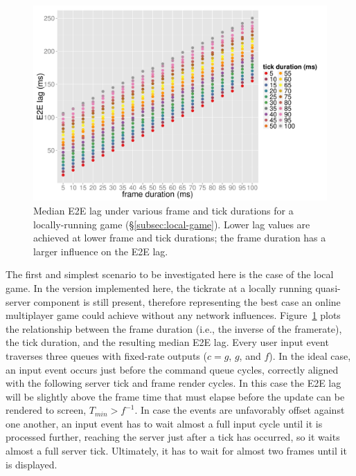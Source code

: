 \begin{figure}[!t]
	\centering
	\includegraphics[width=1.0\columnwidth]{../../../simulation/visualization/nwless-onlinegame-1000rounds.pdf}
	\caption{Median \gls{E2E} lag under various frame and tick durations for a locally-running game (§\ref{subsec:local-game}). Lower lag values are achieved at lower frame and tick durations; the frame duration has a larger influence on the \gls{E2E} lag.}
\label{fig:nwless-scatter}
\end{figure}

The first and simplest scenario to be investigated here is the case of the local game. In the version implemented here, the tickrate at a locally running quasi-server component is still present, therefore representing the best case an online multiplayer game could achieve without any network influences. Figure~\ref{fig:nwless-scatter} plots the relationship between the frame duration (i.e., the inverse of the framerate), the tick duration, and the resulting median \gls{E2E} lag. Every user input event traverses three queues with fixed-rate outputs ($c=g$, $g$, and $f$). In the ideal case, an input event occurs just before the command queue cycles, correctly aligned with the following server tick and frame render cycles. In this case the \gls{E2E} lag will be slightly above the frame time that must elapse before the update can be rendered to screen, $T_{min}>f^{-1}$. In case the events are unfavorably offset against one another, an input event has to wait almost a full input cycle until it is processed further, reaching the server just after a tick has occurred, so it waits almost a full server tick. Ultimately, it has to wait for almost two frames until it is displayed.

